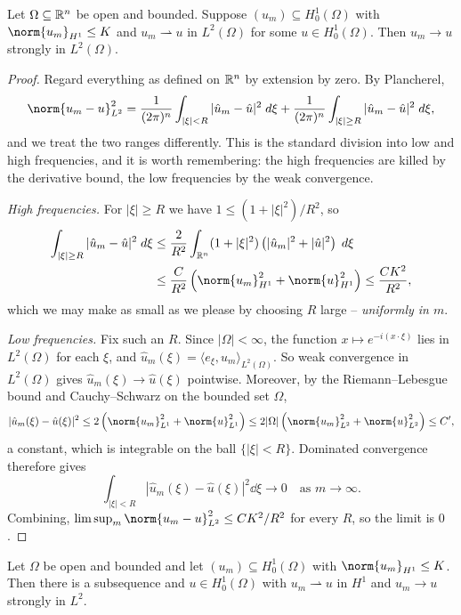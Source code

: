 \documentclass[a4paper]{scrartcl}
\newcommand{\ip}[2]{\langle #1, #2 \rangle}
\newcommand{\weakto}{\rightharpoonup}
\begin{document}
\begin{theorem}\label{thm:rellich}
	Let $\Omega\subseteq\mathbb{R}^n$ be open and bounded. Suppose $(u_m)\subseteq H_0^1(\Omega)$ with $\norm{u_m}_{H^1}\le K$ and $u_m\weakto u$ in $L^2(\Omega)$ for some $u \in H_0^1(\Omega)$. Then $u_m\to u$ strongly in $L^2(\Omega)$.
\end{theorem}

\begin{proof}
	Regard everything as defined on $\mathbb{R}^n$ by extension by zero. By Plancherel,
	$$\norm{u_m-u}_{L^2}^2=\frac{1}{(2\pi)^n}\int_{|\xi|<R}|\hat u_m-\hat u|^2\dd\xi+\frac{1}{(2\pi)^n}\int_{|\xi|\ge R}|\hat u_m-\hat u|^2\dd\xi,$$
	and we treat the two ranges differently. This is the standard division into low and high frequencies, and it is worth remembering: the high frequencies are killed by the derivative bound, the low frequencies by the weak convergence.

	\emph{High frequencies.} For $|\xi|\ge R$ we have $1 \le (1+|\xi|^2)/R^2$, so
	\begin{align*}
		\int_{|\xi|\ge R}|\hat u_m-\hat u|^2\dd\xi &\le\frac{2}{R^2}\int_{\R^n}(1+|\xi|^2)\left(|\hat u_m|^2+|\hat u|^2\right)\dd\xi \\
		&\le\frac{C}{R^2}\left(\norm{u_m}^2_{H^1}+\norm{u}^2_{H^1}\right)\le\frac{CK^2}{R^2},
	\end{align*}
	which we may make as small as we please by choosing $R$ large -- \emph{uniformly in $m$}.

	\emph{Low frequencies.} Fix such an $R$. Since $|\Omega|<\infty$, the function $x\mapsto e^{-i(x\cdot\xi)}$ lies in $L^2(\Omega)$ for each $\xi$, and $\hat u_m(\xi)=\ip{e_\xi}{u_m}_{L^2(\Omega)}$. So weak convergence in $L^2(\Omega)$ gives $\hat u_m(\xi)\to\hat u(\xi)$ pointwise. Moreover, by the Riemann--Lebesgue bound and Cauchy--Schwarz on the bounded set $\Omega$,
	$$|\hat u_m(\xi)-\hat u(\xi)|^2\le2\left(\norm{u_m}^2_{L^1}+\norm{u}^2_{L^1}\right)\le2|\Omega|\left(\norm{u_m}^2_{L^2}+\norm{u}^2_{L^2}\right)\le C',$$
	a constant, which is integrable on the ball $\{|\xi|<R\}$. Dominated convergence therefore gives
	$$\int_{|\xi|<R}|\hat u_m(\xi)-\hat u(\xi)|^2\dd\xi\longrightarrow 0 \quad\text{as } m \to\infty.$$
	Combining, $\limsup_m\norm{u_m-u}^2_{L^2}\le CK^2/R^2$ for every $R$, so the limit is $0$.
\end{proof}

\begin{corollary}\label{cor:rellichseq}
	Let $\Omega$ be open and bounded and let $(u_m)\subseteq H_0^1(\Omega)$ with $\norm{u_m}_{H^1}\le K$. Then there is a subsequence and $u \in H_0^1(\Omega)$ with $u_m\weakto u$ in $H^1$ and $u_m \to u$ strongly in $L^2$.
\end{corollary}
\end{document}
